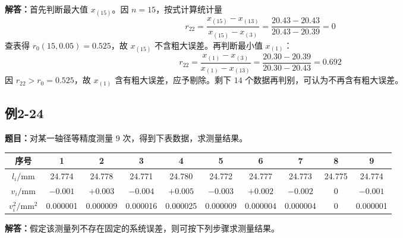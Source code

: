 \documentclass[UTF8,zihao=-4]{ctexart}
\newcommand{\problem}[1]{\subsection*{#1}}
\newcommand{\timu}{\noindent\textbf{题目：}}
\newcommand{\jieda}{\noindent\textbf{解答：}}
\begin{document}
\jieda 首先判断最大值 $x_{(15)}$。因 $n=15$，按式计算统计量
\begin{equation*}
    r_{22}=\frac{x_{(15)}-x_{(13)}}{x_{(15)}-x_{(3)}}=\frac{20.43-20.43}{20.43-20.39}=0
\end{equation*}
查表得 $r_0(15,0.05)=0.525$，故 $x_{(15)}$ 不含粗大误差。再判断最小值 $x_{(1)}$：
\begin{equation*}
    r_{22}=\frac{x_{(1)}-x_{(3)}}{x_{(1)}-x_{(13)}}=\frac{20.30-20.39}{20.30-20.43}=0.692
\end{equation*}
因 $r_{22}>r_0=0.525$，故 $x_{(1)}$ 含有粗大误差，应予剔除。剩下 $14$ 个数据再判别，可认为不再含有粗大误差。

\problem{例2-24}

\timu 对某一轴径等精度测量 $9$ 次，得到下表数据，求测量结果。

\begin{center}
\scriptsize
\setlength{\tabcolsep}{6pt}
\begin{tabular}{c|ccccccccc}
\toprule
序号 & 1 & 2 & 3 & 4 & 5 & 6 & 7 & 8 & 9\\
\midrule
$l_i/\mathrm{mm}$ & 24.774 & 24.778 & 24.771 & 24.780 & 24.772 & 24.777 & 24.773 & 24.775 & 24.774\\
$v_i/\mathrm{mm}$ & $-0.001$ & $+0.003$ & $-0.004$ & $+0.005$ & $-0.003$ & $+0.002$ & $-0.002$ & 0 & $-0.001$\\
$v_i^2/\mathrm{mm}^2$ & 0.000001 & 0.000009 & 0.000016 & 0.000025 & 0.000009 & 0.000004 & 0.000004 & 0 & 0.000001\\
\bottomrule
\end{tabular}
\end{center}

\jieda 假定该测量列不存在固定的系统误差，则可按下列步骤求测量结果。
\end{document}
